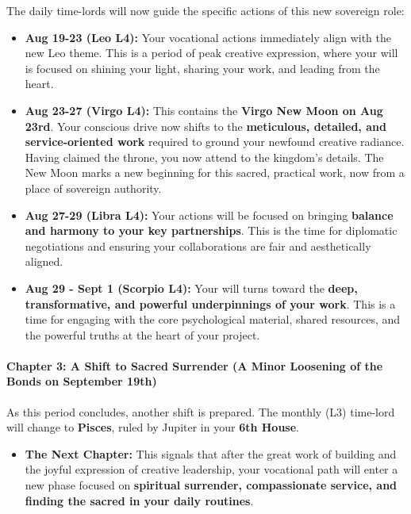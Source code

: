 \documentclass{article}
\begin{document}
The daily time-lords will now guide the specific actions of this new sovereign role:

\begin{itemize}
\item
  \textbf{Aug 19-23 (Leo L4):} Your vocational actions immediately align with the new Leo theme. This is a period of peak creative expression, where your will is focused on shining your light, sharing your work, and leading from the heart.
\item
  \textbf{Aug 23-27 (Virgo L4):} This contains the \textbf{Virgo New Moon on Aug 23rd}. Your conscious drive now shifts to the \textbf{meticulous, detailed, and service-oriented work} required to ground your newfound creative radiance. Having claimed the throne, you now attend to the kingdom's details. The New Moon marks a new beginning for this sacred, practical work, now from a place of sovereign authority.
\item
  \textbf{Aug 27-29 (Libra L4):} Your actions will be focused on bringing \textbf{balance and harmony to your key partnerships}. This is the time for diplomatic negotiations and ensuring your collaborations are fair and aesthetically aligned.
\item
  \textbf{Aug 29 - Sept 1 (Scorpio L4):} Your will turns toward the \textbf{deep, transformative, and powerful underpinnings of your work}. This is a time for engaging with the core psychological material, shared resources, and the powerful truths at the heart of your project.
\end{itemize}

\paragraph*{Chapter 3: A Shift to Sacred Surrender (A Minor Loosening of the Bonds on September 19th)}\label{chapter-3-a-shift-to-sacred-surrender-a-minor-loosening-of-the-bonds-on-september-19th}

As this period concludes, another shift is prepared. The monthly (L3) time-lord will change to \textbf{Pisces}, ruled by Jupiter in your \textbf{6th House}.

\begin{itemize}
\tightlist
\item
  \textbf{The Next Chapter:} This signals that after the great work of building and the joyful expression of creative leadership, your vocational path will enter a new phase focused on \textbf{spiritual surrender, compassionate service, and finding the sacred in your daily routines}.
\end{itemize}
\end{document}
